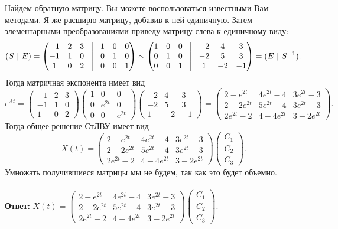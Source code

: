 \documentclass[a4paper, 12pt]{article}
\begin{document}
Найдем обратную матрицу. Вы можете воспользоваться известными Вам методами. Я же расширю матрицу, добавив к ней единичную. Затем элементарными преобразованиями приведу матрицу слева к единичному виду: $$(S\ |\ E) = \begin{pmatrix}
	-1 & 2 & 3 & \vline & 1 & 0 & 0\\
	-1 & 1 & 0 & \vline & 0 & 1 & 0\\
	1 & 0 & 2 & \vline & 0 & 0 & 1
\end{pmatrix}\sim  \begin{pmatrix}
	1 & 0 & 0 & \vline & -2 & 4 & 3 \\
	0 & 1 & 0 & \vline &-2 & 5 & 3 \\
	0 & 0 & 1 & \vline & 1 & -2 & -1
\end{pmatrix} = (E\ |\ S^{-1}).$$
Тогда матричная экспонента имеет вид
$$e^{At} =\begin{pmatrix}
	-1 & 2 & 3\\
	-1 & 1 & 0\\
	1 & 0 & 2
\end{pmatrix}\begin{pmatrix}
1 & 0 & 0\\
0 & e^{2t} & 0\\
0 & 0 & e^{2t}
\end{pmatrix}\begin{pmatrix}
-2 & 4 & 3\\
-2 & 5 & 3\\
1 & -2 & -1
\end{pmatrix} = \begin{pmatrix}
2 - e^{2t} & 4e^{2t} - 4 & 3e^{2t}-3\\
2-2e^{2t} & 5e^{2t} - 4 & 3e^{2t} - 3\\
2e^{2t}-2 & 4-4e^{2t} & 3-2e^{2t}
\end{pmatrix}.$$
Тогда общее решение СтЛВУ имеет вид 
$$X(t) = \begin{pmatrix}
	2 - e^{2t} & 4e^{2t} - 4 & 3e^{2t}-3\\
	2-2e^{2t} & 5e^{2t} - 4 & 3e^{2t} - 3\\
	2e^{2t}-2 & 4-4e^{2t} & 3-2e^{2t}
\end{pmatrix}\begin{pmatrix}
C_1\\C_2\\C_3
\end{pmatrix}.$$
Умножать получившиеся матрицы мы не будем, так как это будет объемно.\\\\
\textbf{Ответ:} $X(t) = \begin{pmatrix}
	2 - e^{2t} & 4e^{2t} - 4 & 3e^{2t}-3\\
	2-2e^{2t} & 5e^{2t} - 4 & 3e^{2t} - 3\\
	2e^{2t}-2 & 4-4e^{2t} & 3-2e^{2t}
\end{pmatrix}\begin{pmatrix}
	C_1\\C_2\\C_3
\end{pmatrix}.$
\end{document}
